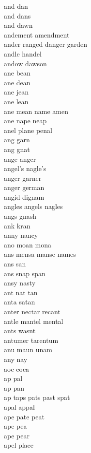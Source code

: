 and dan\\
and dans \\
and dawn \\
andement amendment \\
ander ranged danger garden \\
andle handel \\
andow dawson \\
ane bean \\
ane dean \\
ane jean \\
ane lean \\
ane mean name amen \\
ane nape neap \\
anel plane penal \\
ang garn \\
ang gnat \\
ange anger \\
angel's nagle's\\
anger garner \\
anger german \\
angid dignam \\
angles angels nagles\\
angs gnash \\
ank kran \\
anny nancy \\
ano moan mona \\
ans mensa manse names  \\
ans san\\
ans snap span \\
ansy nasty \\
ant nat tan\\
anta satan \\
anter nectar recant \\
antle mantel mental \\
ants wasnt \\
antumer tarentum \\
anu maun unam \\
any nay\\
aoc coca \\
ap pal \\
ap pan \\
ap taps pats past spat  \\
apal appal \\
ape pate peat \\
ape pea\\
ape pear \\
apel place \\
